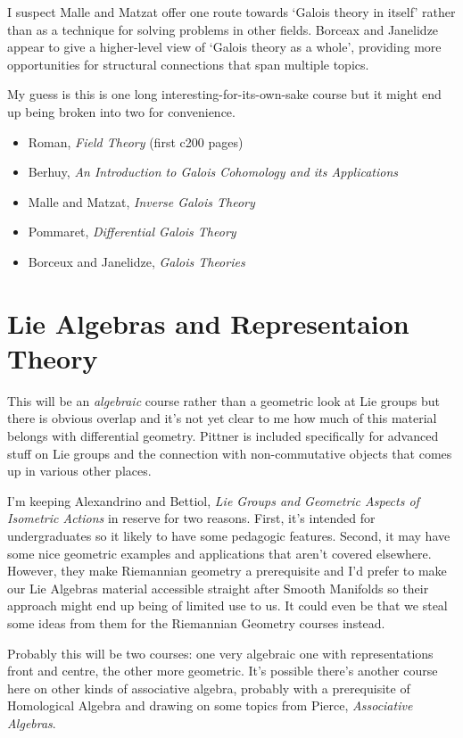 \documentclass[article]{article}
\begin{document}
I suspect Malle and Matzat offer one route towards `Galois theory in itself' rather than as a technique for solving problems in other fields. Borceax and Janelidze appear to give a higher-level view of `Galois theory as a whole', providing more opportunities for structural connections that span multiple topics.

My guess is this is one long interesting-for-its-own-sake course but it might end up being broken into two for convenience.

\begin{itemize}
	\item[]{Roman, \textit{Field Theory} (first c200 pages)}
	\item[]{Berhuy, \textit{An Introduction to Galois Cohomology and its Applications}}
	\item[]{Malle and Matzat, \textit{Inverse Galois Theory}}
	\item[]{Pommaret, \textit{Differential Galois Theory}}
	\item[]{Borceux and Janelidze, \textit{Galois Theories}}
\end{itemize}

\section{Lie Algebras and Representaion Theory}

This will be an \textit{algebraic} course rather than a geometric look at Lie groups but there is obvious overlap and it's not yet clear to me how much of this material belongs with differential geometry. Pittner is included specifically for advanced stuff on Lie groups and the connection with non-commutative objects that comes up in various other places.

I'm keeping Alexandrino and Bettiol, \textit{Lie Groups and Geometric Aspects of Isometric Actions} in reserve for two reasons. First, it's intended for undergraduates so it likely to have some pedagogic features. Second, it may have some nice geometric examples and applications that aren't covered elsewhere. However, they make Riemannian geometry a prerequisite and I'd prefer to make our Lie Algebras material accessible straight after Smooth Manifolds so their approach might end up being of limited use to us. It could even be that we steal some ideas from them for the Riemannian Geometry courses instead.

Probably this will be two courses: one very algebraic one with representations front and centre, the other more geometric. It's possible there's another course here on other kinds of associative algebra, probably with a prerequisite of Homological Algebra and drawing on some topics from Pierce, \textit{Associative Algebras}.
\end{document}
